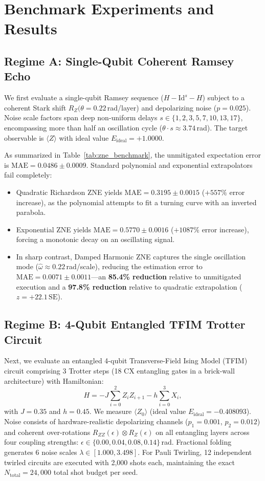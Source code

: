 \documentclass[10pt,twocolumn,a4paper]{article}
\begin{document}
\section{Benchmark Experiments and Results}

\subsection{Regime A: Single-Qubit Coherent Ramsey Echo}
We first evaluate a single-qubit Ramsey sequence ($H - \mathrm{Id}^s - H$) subject to a coherent Stark shift $R_Z(\theta = 0.22\,$rad/layer) and depolarizing noise ($p = 0.025$). Noise scale factors span deep non-uniform delays $s \in \{1, 2, 3, 5, 7, 10, 13, 17\}$, encompassing more than half an oscillation cycle ($\theta \cdot s \approx 3.74\,$rad). The target observable is $\langle Z \rangle$ with ideal value $E_{\mathrm{ideal}} = +1.0000$.

As summarized in Table~\ref{tab:zne_benchmark}, the unmitigated expectation error is $\mathrm{MAE} = 0.0486 \pm 0.0009$. Standard polynomial and exponential extrapolators fail completely:
\begin{itemize}
    \item Quadratic Richardson ZNE yields $\mathrm{MAE} = 0.3195 \pm 0.0015$ ($+557\%$ error increase), as the polynomial attempts to fit a turning curve with an inverted parabola.
    \item Exponential ZNE yields $\mathrm{MAE} = 0.5770 \pm 0.0016$ ($+1087\%$ error increase), forcing a monotonic decay on an oscillating signal.
    \item In sharp contrast, Damped Harmonic ZNE captures the single oscillation mode ($\hat{\omega} \approx 0.22\,$rad/scale), reducing the estimation error to $\mathrm{MAE} = 0.0071 \pm 0.0011$—an \textbf{85.4\% reduction} relative to unmitigated execution and a \textbf{97.8\% reduction} relative to quadratic extrapolation ($z = +22.1\,\mathrm{SE}$).
\end{itemize}

\subsection{Regime B: 4-Qubit Entangled TFIM Trotter Circuit}
Next, we evaluate an entangled 4-qubit Transverse-Field Ising Model (TFIM) circuit comprising 3 Trotter steps (18 $\mathrm{CX}$ entangling gates in a brick-wall architecture) with Hamiltonian:
\begin{equation}
H = -J \sum_{i=0}^2 Z_i Z_{i+1} - h \sum_{i=0}^3 X_i,
\end{equation}
with $J = 0.35$ and $h = 0.45$. We measure $\langle Z_0 \rangle$ (ideal value $E_{\mathrm{ideal}} = -0.408093$). Noise consists of hardware-realistic depolarizing channels ($p_1 = 0.001$, $p_2 = 0.012$) and coherent over-rotations $R_{ZZ}(\epsilon) \otimes R_Z(\epsilon)$ on all entangling layers across four coupling strengths: $\epsilon \in \{0.00, 0.04, 0.08, 0.14\}\,$rad. Fractional folding generates 6 noise scales $\lambda \in [1.000, 3.498]$. For Pauli Twirling, 12 independent twirled circuits are executed with 2,000 shots each, maintaining the exact $N_{\mathrm{total}} = 24{,}000$ total shot budget per seed.
\end{document}
